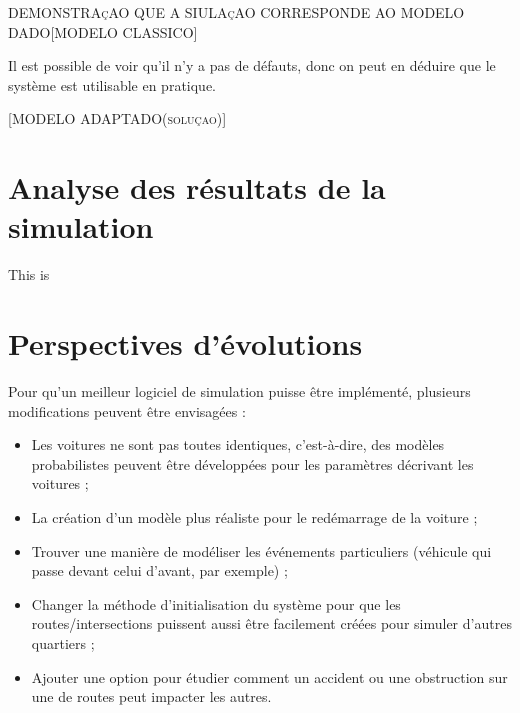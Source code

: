 \documentclass[12pt]{article} %
\begin{document}
\textsc{\Large DEMONSTRAçAO QUE A SIULAçAO CORRESPONDE AO MODELO DADO[MODELO CLASSICO]}

Il est possible de voir qu'il n'y a pas de défauts, donc on peut en déduire que le système est utilisable en pratique.

\textsc{\Large [MODELO ADAPTADO(soluçao)]}

\newpage
\section{Analyse des résultats de la simulation}\label{resultats}
This is

\newpage
\section{Perspectives d'évolutions}\label{evolution}
Pour qu’un meilleur logiciel de simulation puisse être implémenté, plusieurs modifications peuvent être envisagées : 

\begin{itemize}
\item Les voitures ne sont pas toutes identiques, c’est-à-dire, des modèles probabilistes peuvent être développées pour les paramètres décrivant les voitures ;\\

\item La création d’un modèle plus réaliste pour le redémarrage de la voiture ;\\

\item Trouver une manière de modéliser les événements particuliers (véhicule qui passe devant celui d’avant, par exemple) ;\\

\item Changer la méthode d'initialisation du système pour que les routes/intersections puissent aussi être facilement créées pour simuler d'autres quartiers ;\\

\item Ajouter une option pour étudier comment un accident ou une obstruction sur une de routes peut impacter les autres.
\end{itemize} 

\newpage
\end{document}
